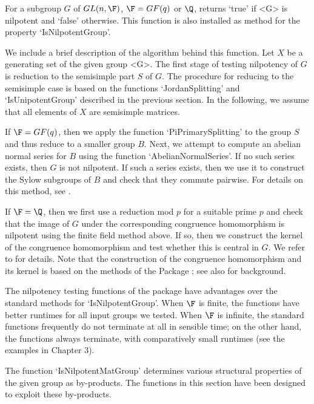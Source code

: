 For a subgroup $G$ of $GL(n,\F)$, $\F=GF(q)$ or $\Q$, returns
`true' if <G> is nilpotent and `false' otherwise. This function is
also installed as method for the property `IsNilpotentGroup'.

We include a brief description of the algorithm behind this function.
Let $X$ be a generating set of the given group <G>. The first stage
of testing nilpotency of $G$ is reduction to the semisimple part $S$
of $G$. The procedure for reducing to the semisimple case is based on
the  functions `JordanSplitting' and `IsUnipotentGroup'
described in the previous section. In the following, we assume that
all elements of $X$ are semisimple matrices.

If $\F=GF(q)$, then we apply the function `PiPrimarySplitting' to
the group $S$ and thus reduce to a smaller group $B$. Next, we
attempt to compute an abelian normal series for $B$ using the
function `AbelianNormalSeries'. If no such series exists, then $G$
is not nilpotent. If such a series exists, then we use it to
construct the Sylow subgroups of $B$ and check that they commute
pairwise. For details on this method, see \cite{DF06}.

If $\F=\Q$, then we first use a reduction mod $p$ for a suitable
prime $p$ and check that the image of $G$ under the corresponding
congruence homomorphism is nilpotent using the finite field method
above. If so, then we construct the kernel of the congruence
homomorphism and test whether this is central in $G$. We refer to
\cite{DF07} for details. Note that the construction of the
congruence homomorphism and its kernel is based on the methods of
the Package ; see also \cite{AE05} for
background.

The nilpotency testing functions of the package 
have advantages over the standard {\GAP} methods for
`IsNilpotentGroup'. When $\F$ is finite, the 
functions have better runtimes for all input groups we tested.
When $\F$ is infinite, the standard {\GAP} functions frequently do
not terminate at all in sensible time; on the other hand, the
 functions always terminate, with comparatively
small runtimes (see the examples in Chapter 3).


The function `IsNilpotentMatGroup' determines various structural
properties of the given group as by-products. The functions in
this section have been designed to exploit these by-products.

